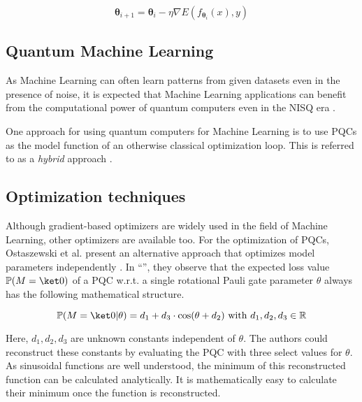 \begin{equation}
    \mathbf{\theta}_{i+1} = \mathbf{\theta}_i - \eta\nabla E(f_{\mathbf{\theta}_i}(x), y)
\end{equation}


\subsection{Quantum Machine Learning}
\label{sec:real-qml-intro}

As Machine Learning can often learn patterns from given datasets even in the
presence of noise, it is expected that Machine Learning applications can benefit
from the computational power of quantum computers even in the NISQ era
\cite{ciliberto_quantum_2018,cerezo_variational_2021}.

One approach for using quantum computers for Machine Learning is to use
PQCs as the model function of an otherwise classical optimization loop.
This is referred to as a \emph{hybrid} approach
\cite{benedetti_parameterized_2019,mitarai_quantum_2018}.


\subsection{Optimization techniques}
\label{sec:optimizers}

Although gradient-based optimizers are widely used in the field of Machine
Learning, other optimizers are available too.
For the optimization of PQCs, Ostaszewski et al. present an alternative approach
that optimizes model parameters independently \cite{ostaszewski_structure_2021}.
In ``\emph{}'', they observe that
the expected loss value $\mathbb P(M = \ket 0)$ of a PQC w.r.t. a single
rotational Pauli gate parameter $\theta$ always has the following mathematical
structure.

\begin{equation}
    \mathbb{P}(M = \ket 0 | \theta) = d_1 + d_3 \cdot \cos(\theta + d_2)
    \text{ with } d_1,d_2,d_3 \in \mathbb R
\end{equation}

Here, $d_1, d_2, d_3$ are unknown constants independent of $\theta$.
The authors could reconstruct these constants by evaluating the PQC with three
select values for $\theta$.
As sinusoidal functions are well understood, the minimum of this reconstructed
function can be calculated analytically.
It is mathematically easy to
calculate their minimum once the function is reconstructed.
